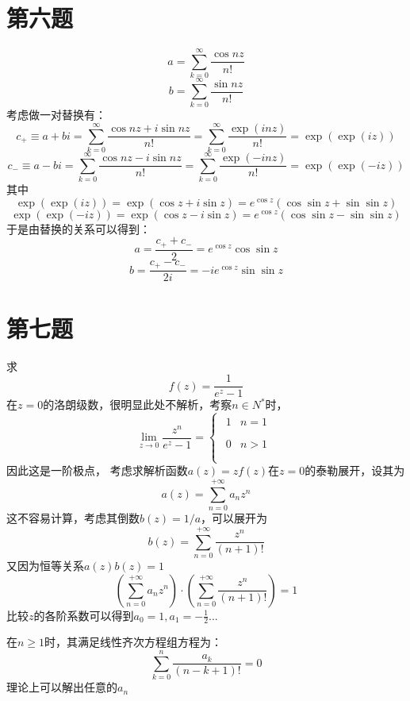 \documentclass[a4paper]{ctexart}
\begin{document}
\section{第六题}
$$a=\sum_{k=0}^{\infty} \frac{\cos n z}{n !} $$
$$b=\sum_{k=0}^{\infty} \frac{\sin n z}{n !} $$
考虑做一对替换有：
$$
    c_+\equiv a+bi=\sum_{k=0}^{\infty}{\frac{\cos nz+i\sin nz}{n!}}=\sum_{k=0}^{\infty}{\frac{\exp \left( inz \right)}{n!}}=\exp \left( \exp \left( iz \right) \right)
$$
$$
    c_-\equiv a-bi=\sum_{k=0}^{\infty}{\frac{\cos nz-i\sin nz}{n!}}=\sum_{k=0}^{\infty}{\frac{\exp \left( -inz \right)}{n!}}=\exp \left( \exp \left( -iz \right) \right)
$$
其中
$$
    \exp \left( \exp \left( iz \right) \right) =\exp \left( \cos z+i\sin z \right) =e^{\cos z}\left( \cos\sin z+\sin\sin z \right)
$$
$$
    \exp \left( \exp \left( -iz \right) \right) =\exp \left( \cos z-i\sin z \right) =e^{\cos z}\left( \cos\sin z-\sin\sin z \right)
$$
于是由替换的关系可以得到：
$$
    a=\frac{c_++c_-}{2}=e^{\cos z}\cos\sin z
$$
$$
    b=\frac{c_+-c_-}{2i}=-ie^{\cos z}\sin\sin z
$$

\section{第七题}
求
$$
    f\left( z \right) =\frac{1}{e^z-1}
$$
在$z=0$的洛朗级数，很明显此处不解析，考察$n\in N^*$时，
$$
    \underset{z\rightarrow 0}{\lim}\frac{z^n}{e^z-1}=\left\{ \begin{array}{l}
        \begin{matrix}
            1 & n=1 \\
        \end{matrix} \\
        \begin{matrix}
            0 & n>1 \\
        \end{matrix} \\
    \end{array} \right.
$$
因此这是一阶极点，
考虑求解析函数$a(z)=zf(z)$在$z=0$的泰勒展开，设其为
$$
    a\left( z \right) =\sum_{n=0}^{+\infty}{a_nz^n}
$$
这不容易计算，考虑其倒数$b(z)=1/a$，可以展开为
$$
    b\left( z \right) =\sum_{n=0}^{+\infty}{\frac{z^n}{\left( n+1 \right) !}}
$$
又因为恒等关系$a(z)b(z)=1$
$$
    \left( \sum_{n=0}^{+\infty}{a_nz^n} \right) \cdot \left( \sum_{n=0}^{+\infty}{\frac{z^n}{\left( n+1 \right) !}} \right) =1
$$
比较$z$的各阶系数可以得到$a_0=1,a_{1}=-\frac{1}{2}$...

在$n\geq 1$时，其满足线性齐次方程组方程为：
$$
    \sum_{k=0}^n{\frac{a_k}{\left( n-k+1 \right) !}}=0
$$
理论上可以解出任意的$a_n$
\end{document}
